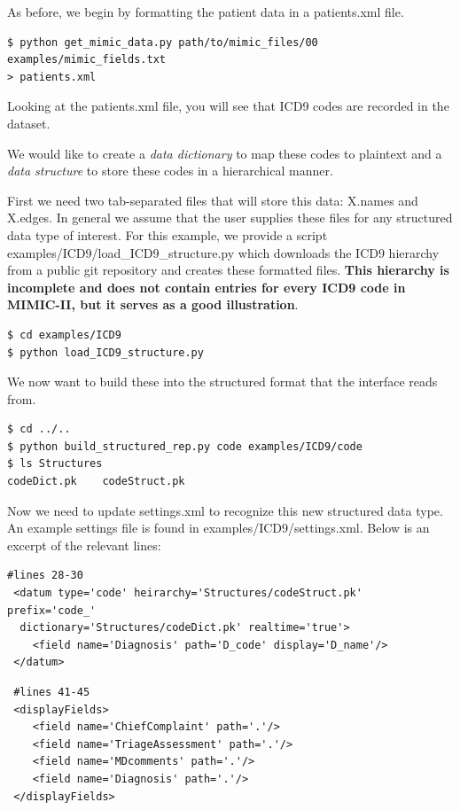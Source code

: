 \documentclass[12pt]{article}
\begin{document}
As before, we begin by formatting the patient data in a patients.xml file.
\begin{verbatim}
$ python get_mimic_data.py path/to/mimic_files/00 examples/mimic_fields.txt 
> patients.xml
\end{verbatim}

Looking at the patients.xml file, you will see that ICD9 codes are recorded in the dataset.

We would like to create a {\em data dictionary} to map these codes to plaintext and a {\em data structure} to store these codes in a hierarchical manner.

First we need two tab-separated files that will store this data: X.names and X.edges. 
In general we assume that the user supplies these files for any structured data type of interest.
For this example, we provide a script examples/ICD9/load\_ICD9\_structure.py which downloads the ICD9 hierarchy from a public git repository and creates these formatted files. {\bf This hierarchy is incomplete and does not contain entries for every ICD9 code in MIMIC-II, but it serves as a good illustration}.

\begin{verbatim}
$ cd examples/ICD9
$ python load_ICD9_structure.py
\end{verbatim}

We now want to build these into the structured format that the interface reads from.
\begin{verbatim}
$ cd ../..
$ python build_structured_rep.py code examples/ICD9/code
$ ls Structures
codeDict.pk    codeStruct.pk
\end{verbatim}

Now we need to update settings.xml to recognize this new structured data type. An example settings file is found in examples/ICD9/settings.xml. Below is an excerpt of the relevant lines:

\begin{verbatim}
#lines 28-30
 <datum type='code' heirarchy='Structures/codeStruct.pk' prefix='code_'
  dictionary='Structures/codeDict.pk' realtime='true'>
    <field name='Diagnosis' path='D_code' display='D_name'/>
 </datum>
 \end{verbatim}

 \begin{verbatim}
 #lines 41-45
 <displayFields>
    <field name='ChiefComplaint' path='.'/>
    <field name='TriageAssessment' path='.'/>
    <field name='MDcomments' path='.'/>
    <field name='Diagnosis' path='.'/>
 </displayFields>
\end{verbatim}
\end{document}
